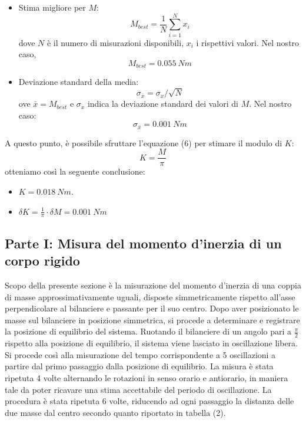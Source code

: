 \begin{itemize}
    \item Stima migliore per $M$:
    \begin{equation}
        M_{best} = \frac{1}{N}\sum_{i=1}^{N} x_i
    \end{equation}
    dove $N$ è il numero di misurazioni disponibili, $x_i$ i rispettivi valori. Nel nostro caso,
    \begin{equation}
        M_{best} = 0.055 \ Nm
    \end{equation}
    \item Deviazione standard della media:
    \begin{equation}
        \sigma_{\bar{x}} = \sigma_x/\sqrt{N}
    \end{equation}
    ove $\bar{x} = M_{best}$ e $\sigma_x$ indica la deviazione standard dei valori di $M$. Nel nostro caso:
    \begin{equation}
        \sigma_{\bar{x}} = 0.001 \ Nm
    \end{equation}
\end{itemize}
A questo punto, è possibile sfruttare l'equazione (6) per stimare il modulo di $K$:
\begin{equation}
    K = \frac{M}{\pi} 
\end{equation}
otteniamo così la seguente conclusione: 
\begin{itemize}
    \item $K = 0.018 \ Nm$. 
    \item $\delta K = \frac{1}{\pi}\cdot \delta M = 0.001 \  Nm$
\end{itemize}

\subsection{Parte I: Misura del momento d'inerzia di un corpo rigido}
Scopo della presente sezione è la misurazione del momento d'inerzia di una coppia di masse approssimativamente uguali, disposte simmetricamente rispetto all'asse perpendicolare al bilanciere e passante per il suo centro. Dopo aver posizionato le masse sul bilanciere in posizione simmetrica, si procede a determinare e registrare la posizione di equilibrio del sistema. Ruotando il bilanciere di un angolo pari a $\frac{\pi}{2}$ rispetto alla posizione di equilibrio, il sistema viene lasciato in oscillazione libera. Si procede così alla misurazione del tempo corrispondente a 5 oscillazioni a partire dal primo passaggio dalla posizione di equilibrio. La misura è stata ripetuta 4 volte alternando le rotazioni in senso orario e antiorario, in maniera tale da poter ricavare una stima accettabile del periodo di oscillazione. La procedura è stata ripetuta 6 volte, riducendo ad ogni passaggio la distanza delle due masse dal centro secondo quanto riportato in tabella (2).

